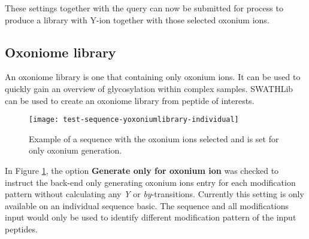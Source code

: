 \documentclass[../manual.tex]{subfiles}
\begin{document}
These settings together with the query can now be submitted for process to produce a library with Y-ion together with those selected oxonium ions.\par

\subsection{Oxoniome library}
An oxoniome library is one that containing only oxonium ions. It can be used to quickly gain an overview of glycosylation within complex samples. SWATHLib can be used to create an oxoniome library from peptide of interests. 

\begin{figure}[H]
	\centering
	\begin{framed}
        \centering
        \begin{adjustbox}{width=1\textwidth}
			\texttt{[image: test-sequence-yoxoniumlibrary-individual]}
		\end{adjustbox}
		\caption{Example of a sequence with the oxonium ions selected and is set for only oxonium generation.}\label{fig:testsequenceyoxoniumlibraryindividual}
	\end{framed}
\end{figure}

In Figure \ref{fig:testsequenceyoxoniumlibraryindividual}, the option \textbf{Generate only for oxonium ion} was checked to instruct the back-end only generating oxonium ions entry for each modification pattern without calculating any \emph{Y} or \emph{by}-transitions. Currently this setting is only available on an individual sequence basic. The sequence and all modifications input would only be used to identify different modification pattern of the input peptides.
\end{document}

